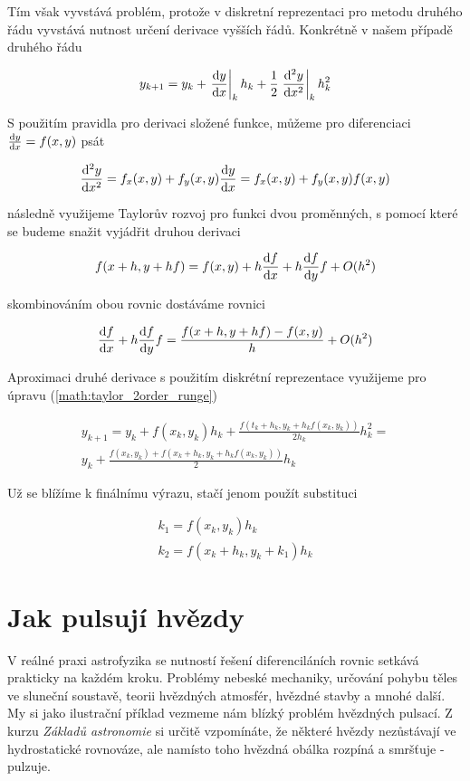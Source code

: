 Tím však vyvstává problém, protože v diskretní reprezentaci pro metodu druhého řádu vyvstává nutnost určení derivace vyšších řádů. Konkrétně v našem případě druhého řádu

\begin{equation}
\label{math:taylor_2order_runge}
y_{k+1} = y_{k} + \left.\frac{{\rm d}y}{{\rm d}x}\right|_{k}
          h_k + \frac{1}{2} \left.\frac{{\rm d}^2 y}{{\rm d}x^2}\right|_{k} h_{k}^2
\end{equation}

S použitím pravidla pro derivaci složené funkce, můžeme pro diferenciaci $\frac{{\rm d}y}{{\rm d}x}=f(x,y)$ psát

\begin{equation}
\frac{{\rm d}^2 y}{{\rm d}x^2} = f_x(x,y)+f_y(x,y) \frac{{\rm d}y}{{\rm d}x} = f_x(x,y)+f_y(x,y) f(x,y)
\end{equation}

následně využijeme Taylorův rozvoj pro funkci dvou proměnných, s
pomocí které se budeme snažit vyjádřit druhou derivaci  

\begin{equation}
f(x+h,y+hf) = f(x,y)+h \frac{{\rm d}f}{{\rm d}x}+h\frac{{\rm d}f}{{\rm d}y}f+O(h^2)
\end{equation}

skombinováním obou rovnic dostáváme rovnici

\begin{equation}
\frac{{\rm d}f}{{\rm d}x}+h\frac{{\rm d}f}{{\rm d}y}f =
\frac{f(x+h,y+hf)-f(x,y)}{h}+O(h^2)
\end{equation}

Aproximaci druhé derivace s použitím diskrétní reprezentace využijeme
pro úpravu (\ref{math:taylor_2order_runge})

\begin{eqnarray}
y_{k+1} = y_k+f(x_k,y_k)h_k+\frac{f(t_k+h_k,y_k+h_k
  f(x_k,y_k))}{2h_k}h_k^2= \\
y_k+\frac{f(x_k,y_k)+f(x_k+h_k,y_k+h_k f(x_k,y_k))}{2}h_k
\end{eqnarray}

Už se blížíme k finálnímu výrazu, stačí jenom použít substituci

\begin{eqnarray}
k_1 = f(x_k,y_k)h_k \\
k_2 = f(x_k+h_k,y_k+k_1)h_k
\end{eqnarray}


\section{Jak pulsují hvězdy}
V reálné praxi astrofyzika se nutností řešení diferenciláních rovnic
setkává prakticky na každém kroku. Problémy nebeské mechaniky,
určování pohybu těles ve sluneční soustavě, teorii hvězdných atmosfér,
hvězdné stavby a mnohé další. My si jako ilustrační příklad vezmeme
nám blízký problém hvězdných pulsací. Z kurzu {\it Základů astronomie}
si určitě vzpomínáte, že některé hvězdy nezůstávají ve hydrostatické
rovnováze, ale namísto toho hvězdná obálka rozpíná a smršťuje - pulzuje.

